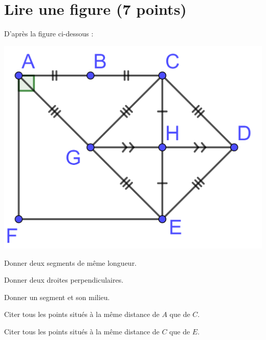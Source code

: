 \section{Lire une figure (7 points)}

D'après la figure ci-dessous :

\begin{center}
	\includegraphics*[scale=0.25]{img/figure}	
\end{center}

\begin{questions}
	\question[1] Donner deux segments de même longueur.
	
	\question[1] Donner deux droites perpendiculaires.
	
	\question[1] Donner un segment et son milieu.
	
	\question[2] Citer tous les points situés à la même distance de $A$ que de $C$.
	
	\question[2] Citer tous les points situés à la même distance de $C$ que de $E$.
\end{questions}